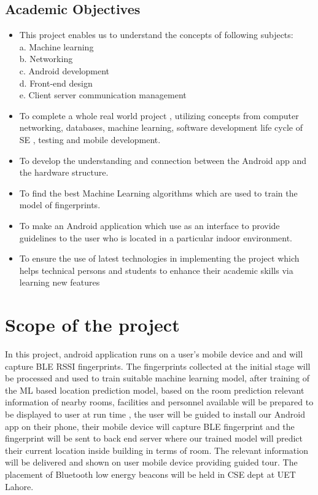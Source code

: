 \subsection{Academic Objectives}
\begin{itemize}
\item This project enables us to understand the concepts of following subjects:
\\a.	Machine learning
\\b.	Networking
\\c.	Android development
\\d.	Front-end design
\\e.	Client server communication management
\item To complete a whole real world project , utilizing concepts from computer networking, databases, machine learning, software development life cycle of SE , testing and mobile development.
\item To develop the understanding and connection between the Android app and the hardware structure. 
\item To find the best Machine Learning algorithms which are used to train the model of fingerprints. 
\item To make an Android application which use as an interface to provide guidelines to the user who is located in a particular indoor environment.
\item To ensure the use of latest technologies in implementing the project which helps technical persons and students to enhance their academic skills via learning new features


\end{itemize}

\section{Scope of the project}
In this project, android application runs on a user’s mobile device and and will capture BLE RSSI fingerprints. The fingerprints collected at the initial stage will be processed and used to train suitable machine learning model, after training of the ML based location prediction model, based on the room prediction relevant information of nearby rooms, facilities and personnel available will be prepared to be displayed to user at run time , the user will be guided to install our Android app on their phone, their mobile device will capture BLE fingerprint and the fingerprint will be sent to back end server where our trained model will predict their current location inside building in terms of room\cite{Loco}. The relevant information will be delivered and shown on user mobile device providing guided tour. 
The placement of Bluetooth low energy beacons will be held in CSE dept at UET Lahore. 


